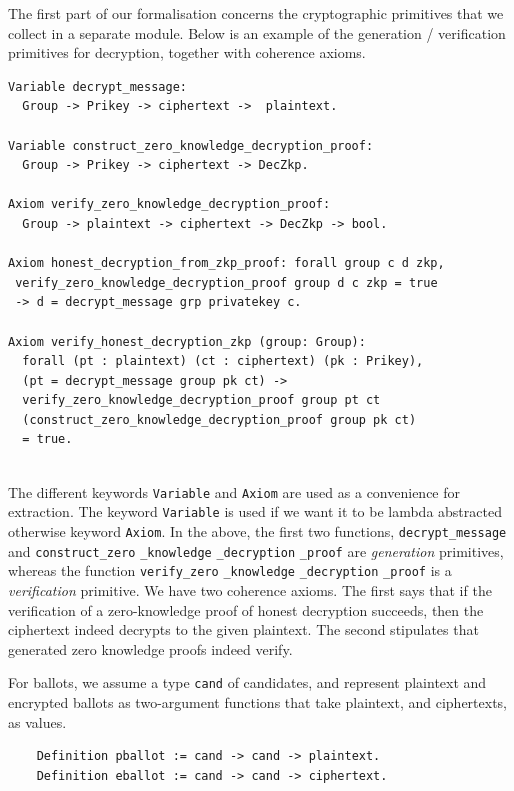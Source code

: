 The first part of our formalisation concerns the cryptographic
primitives that we collect in a separate module. Below is an example
of the generation / verification primitives for decryption, together
with coherence axioms.

\begin{verbatim}
Variable decrypt_message: 
  Group -> Prikey -> ciphertext ->  plaintext.

Variable construct_zero_knowledge_decryption_proof:
  Group -> Prikey -> ciphertext -> DecZkp.

Axiom verify_zero_knowledge_decryption_proof:
  Group -> plaintext -> ciphertext -> DecZkp -> bool.

Axiom honest_decryption_from_zkp_proof: forall group c d zkp, 
 verify_zero_knowledge_decryption_proof group d c zkp = true 
 -> d = decrypt_message grp privatekey c.
 
Axiom verify_honest_decryption_zkp (group: Group):
  forall (pt : plaintext) (ct : ciphertext) (pk : Prikey),
  (pt = decrypt_message group pk ct) ->
  verify_zero_knowledge_decryption_proof group pt ct 
  (construct_zero_knowledge_decryption_proof group pk ct) 
  = true.
  

\end{verbatim}
  
\noindent
The different keywords \texttt{Variable} and \texttt{Axiom}
are used as a convenience for 
extraction. The keyword  \texttt{Variable} is used if we want it
to be lambda abstracted otherwise keyword \texttt{Axiom}. In
the above, the first two functions, \texttt{decrypt\_message} and
\texttt{construct\_zero} \texttt{\_knowledge} \texttt{\_decryption} \texttt{\_proof} are
\emph{generation} primitives, whereas the function 
\texttt{verify\_zero} \texttt{\_knowledge} \linebreak
\texttt{\_decryption} \texttt{\_proof} is a
\emph{verification} primitive. We have two coherence axioms. The
first says that if the verification of a zero-knowledge proof of
honest decryption succeeds, then the ciphertext indeed decrypts to
the given plaintext. The second stipulates that generated zero
knowledge proofs indeed verify. 

For ballots, we assume a type \texttt{cand} of candidates, and
represent plaintext and encrypted ballots as two-argument functions
that take plaintext, and ciphertexts, as values. 
\begin{verbatim}
    Definition pballot := cand -> cand -> plaintext.
    Definition eballot := cand -> cand -> ciphertext.
\end{verbatim}


